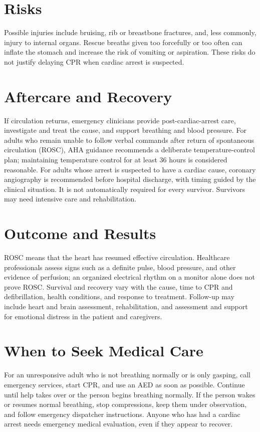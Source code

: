 \section*{Risks}
Possible injuries include bruising, rib or breastbone fractures, and, less commonly, injury to internal organs. Rescue breaths given too forcefully or too often can inflate the stomach and increase the risk of vomiting or aspiration. These risks do not justify delaying CPR when cardiac arrest is suspected.

\section*{Aftercare and Recovery}
If circulation returns, emergency clinicians provide post-cardiac-arrest care, investigate and treat the cause, and support breathing and blood pressure. For adults who remain unable to follow verbal commands after return of spontaneous circulation (ROSC), AHA guidance recommends a deliberate temperature-control plan; maintaining temperature control for at least 36 hours is considered reasonable. For adults whose arrest is suspected to have a cardiac cause, coronary angiography is recommended before hospital discharge, with timing guided by the clinical situation. It is not automatically required for every survivor. Survivors may need intensive care and rehabilitation.

\section*{Outcome and Results}
ROSC means that the heart has resumed effective circulation. Healthcare professionals assess signs such as a definite pulse, blood pressure, and other evidence of perfusion; an organized electrical rhythm on a monitor alone does not prove ROSC. Survival and recovery vary with the cause, time to CPR and defibrillation, health conditions, and response to treatment. Follow-up may include heart and brain assessment, rehabilitation, and assessment and support for emotional distress in the patient and caregivers.

\section*{When to Seek Medical Care}
For an unresponsive adult who is not breathing normally or is only gasping, call emergency services, start CPR, and use an AED as soon as possible. Continue until help takes over or the person begins breathing normally. If the person wakes or resumes normal breathing, stop compressions, keep them under observation, and follow emergency dispatcher instructions. Anyone who has had a cardiac arrest needs emergency medical evaluation, even if they appear to recover.

